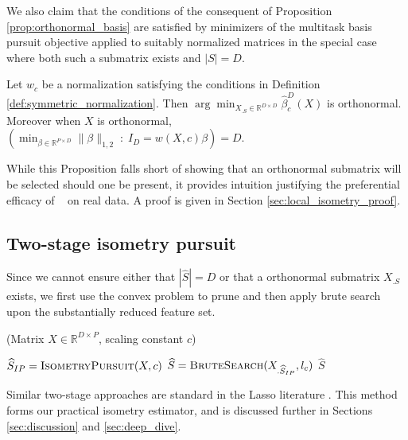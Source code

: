 We also claim that the conditions of the consequent of Proposition \ref{prop:orthonormal_basis} are satisfied by minimizers of the multitask basis pursuit objective applied to suitably normalized matrices in the special case where both such a submatrix exists and $| S| = D$.
\begin{proposition}
Let $w_c$ be a normalization satisfying the conditions in Definition \ref{def:symmetric_normalization}.
Then $\arg \min_{X_{.S} \in \mathbb R^{D \times D}} \widehat \beta^{D}_c ( X) $ is orthonormal.
Moreover when $X$ is orthonormal, $(\min_{\beta \in \mathbb R^{P \times D}} \| \beta \|_{1,2} \; : \; I_D = w ({  X}, c) \beta) = D$.
\label{prop:unitary_selection}
\end{proposition}
While this Proposition falls short of showing that an orthonormal submatrix will be selected should one be present, it provides intuition justifying the preferential efficacy of \isometrypursuit~ on real data.
A proof is given in Section \ref{sec:local_isometry_proof}.

\subsection{Two-stage isometry pursuit}

Since we cannot ensure either that $|\widehat {  S}| = D$ or that a orthonormal submatrix $X_{.S}$ exists, we first use the convex problem to prune and then apply brute search upon the substantially reduced feature set.

\begin{algorithm}[H]
\caption{\tsip(Matrix ${X} \in \mathbb{R}^{D \times P}$, scaling constant $c$)}
\begin{algorithmic}[1]
\STATE $\widehat{S}_{IP} = \text{{\sc IsometryPursuit}}( X, c)$
\STATE $\widehat{S} = \text {{\sc BruteSearch}}({X}_{.\widehat{S}_{IP}}, l_c)$
 $\widehat{S}$
\end{algorithmic}
\end{algorithm}

Similar two-stage approaches are standard in the Lasso literature \cite{Hesterberg2008-iy}.
This method forms our practical isometry estimator, and is discussed further in Sections \ref{sec:discussion} and \ref{sec:deep_dive}.